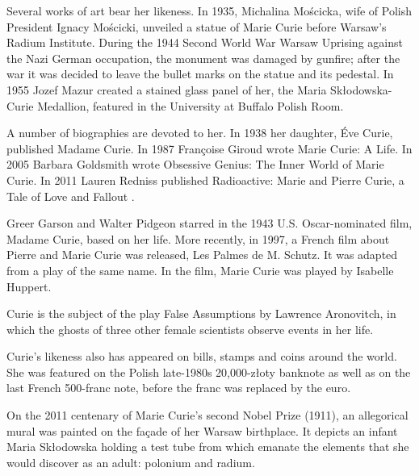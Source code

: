 \documentclass[12pt,a4paper]{article}
\begin{document}
Several works of art bear her likeness. In 1935, Michalina Mo\'scicka, wife of Polish President Ignacy Mo\'scicki, unveiled a statue of Marie Curie before Warsaw's Radium Institute. During the 1944 Second World War Warsaw Uprising against the Nazi German occupation, the monument was damaged by gunfire; after the war it was decided to leave the bullet marks on the statue and its pedestal. In 1955 Jozef Mazur created a stained glass panel of her, the Maria Sk\l{}odowska-Curie Medallion, featured in the University at Buffalo Polish Room.

A number of biographies are devoted to her. In 1938 her daughter, \'Eve Curie, published Madame Curie. In 1987 Fran\c{c}oise Giroud wrote Marie Curie: A Life. In 2005 Barbara Goldsmith wrote Obsessive Genius: The Inner World of Marie Curie. In 2011 Lauren Redniss published Radioactive: Marie and Pierre Curie, a Tale of Love and Fallout .

Greer Garson and Walter Pidgeon starred in the 1943 U.S. Oscar-nominated film, Madame Curie, based on her life. More recently, in 1997, a French film about Pierre and Marie Curie was released, Les Palmes de M. Schutz. It was adapted from a play of the same name. In the film, Marie Curie was played by Isabelle Huppert.

Curie is the subject of the play False Assumptions by Lawrence Aronovitch, in which the ghosts of three other female scientists observe events in her life.

Curie's likeness also has appeared on bills, stamps and coins around the world. She was featured on the Polish late-1980s 20,000-z\l{}oty banknote as well as on the last French 500-franc note, before the franc was replaced by the euro.

On the 2011 centenary of Marie Curie's second Nobel Prize (1911), an allegorical mural was painted on the fa\c{c}ade of her Warsaw birthplace. It depicts an infant Maria Sk\l{}odowska holding a test tube from which emanate the elements that she would discover as an adult: polonium and radium.



\end{document}
